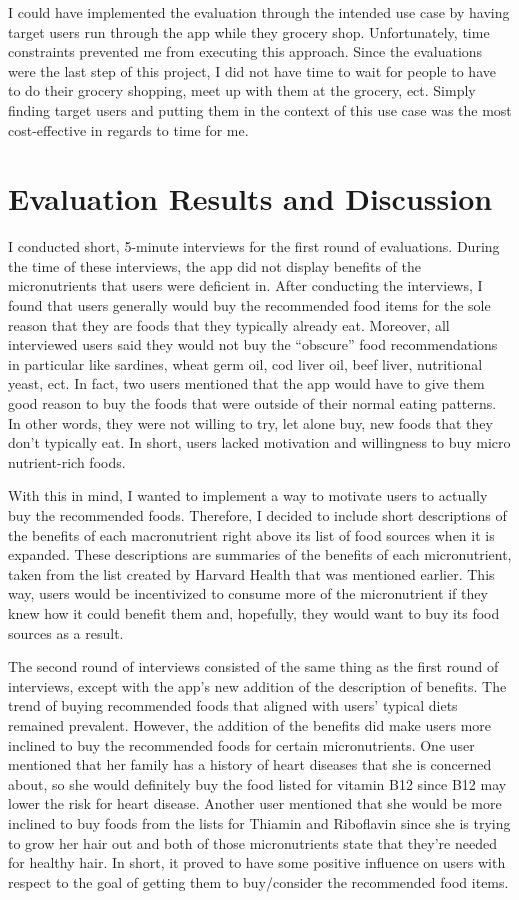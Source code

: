 \documentclass[10pt,twocolumn]{article}
\begin{document}
I could have implemented the evaluation through the intended use case by having target users run through the app while they grocery shop. Unfortunately, time constraints prevented me from executing this approach. Since the evaluations were the last step of this project, I did not have time to wait for people to have to do their grocery shopping, meet up with them at the grocery, ect. Simply finding target users and putting them in the context of this use case was the most cost-effective in regards to time for me. 

\section{Evaluation Results and Discussion}
I conducted short, 5-minute interviews for the first round of evaluations. During the time of these interviews, the app did not display benefits of the micronutrients that users were deficient in. After conducting the interviews, I found that users generally would buy the recommended food items for the sole reason that they are foods that they typically already eat. Moreover, all interviewed users said they would not buy the “obscure” food recommendations in particular like sardines, wheat germ oil, cod liver oil, beef liver, nutritional yeast, ect. In fact, two users mentioned that the app would have to give them good reason to buy the foods that were outside of their normal eating patterns. In other words, they were not willing to try, let alone buy, new foods that they don’t typically eat. In short, users lacked motivation and willingness to buy micro nutrient-rich foods. 

With this in mind, I wanted to implement a way to motivate users to actually buy the recommended foods. Therefore, I decided to include short descriptions of the benefits of each macronutrient right above its list of food sources when it is expanded. These descriptions are summaries of the benefits of each micronutrient, taken from the list created by Harvard Health that was mentioned earlier.\cite{harvard_health_2020} This way, users would be incentivized to consume more of the micronutrient if they knew how it could benefit them and, hopefully, they would want to buy its food sources as a result. 

The second round of interviews consisted of the same thing as the first round of interviews, except with the app’s new addition of the description of benefits. The trend of buying recommended foods that aligned with users' typical diets remained prevalent. However, the addition of the benefits did make users more inclined to buy the recommended foods for certain micronutrients. One user mentioned that her family has a history of heart diseases that she is concerned about, so she would definitely buy the food listed for vitamin B12 since B12 may lower the risk for heart disease. Another user mentioned that she would be more inclined to buy foods from the lists for Thiamin and Riboflavin since she is trying to grow her hair out and both of those micronutrients state that they’re needed for healthy hair. In short, it proved to have some positive influence on users with respect to the goal of getting them to buy/consider the recommended food items.  
\end{document}
